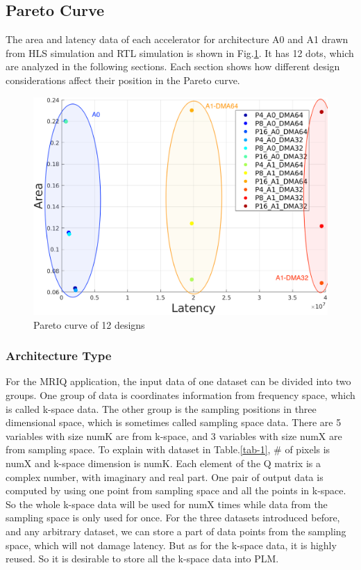 \documentclass{sig-alternate}
\begin{document}
\subsection{Pareto Curve}
The area and latency data of each accelerator for architecture A0 and A1 drawn from HLS simulation and RTL simulation is shown in Fig.\ref{fig-1}. It has 12 dots, which are analyzed in the following sections. Each section shows how different design considerations affect their position in the Pareto curve. 
\begin{figure}[h!]
    \centering
    \includegraphics[width=0.85\columnwidth]{figure/result_all.png}
    \caption{Pareto curve of 12 designs}
    \label{fig-1}
\end{figure}



\subsubsection{Architecture Type}
For the MRIQ application, the input data of one dataset can be divided into two groups. One group of data is coordinates information from frequency space, which is called k-space data. The other group is the sampling positions in three dimensional space, which is sometimes called sampling space data. There are 5 variables with size numK are from k-space, and 3 variables with size numX are from sampling space. To explain with dataset in Table.\ref{tab-1}, \# of pixels is numX and k-space dimension is numK. Each element of the Q matrix is a complex number, with imaginary and real part. One pair of output data is computed by using one point from sampling space and all the points in k-space. So the whole k-space data will be used for numX times while data from the sampling space is only used for once. For the three datasets introduced before, and any arbitrary dataset, we can store a part of data points from the sampling space, which will not damage latency. But as for the k-space data, it is highly reused. So it is desirable to store all the k-space data into PLM. \\
\end{document}
